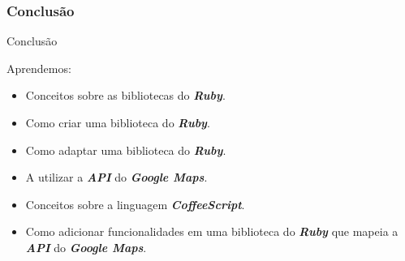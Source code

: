 \begin{frame}
 \frametitle{Conclusão}

  \begin{block}{Conclusão}

   Aprendemos:

   \begin{itemize}

    \item Conceitos sobre as bibliotecas do \emph{\textbf{Ruby}}.

    \item Como criar uma biblioteca do \emph{\textbf{Ruby}}.

    \item Como adaptar uma biblioteca do \emph{\textbf{Ruby}}.

    \item A utilizar a \emph{\textbf{API}} do \emph{\textbf{Google Maps}}.

    \item Conceitos sobre a linguagem \emph{\textbf{CoffeeScript}}.
    
    \item Como adicionar funcionalidades em uma biblioteca do \emph{\textbf{Ruby}} que mapeia a
    \emph{\textbf{API}} do \emph{\textbf{Google Maps}}.    

   \end{itemize}

  \end{block}

\end{frame}
